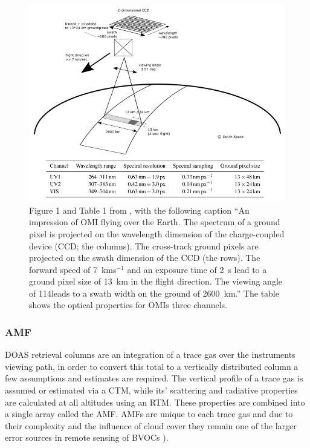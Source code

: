       \begin{figure}
        \includegraphics[width=\textwidth]{Figures/Shenkeveld_OMI_summary.png}
        \caption{ %
          Figure 1 and Table 1 from \cite{Schenkeveld2017}, with the following caption ``An impression of OMI flying over the Earth.
          The spectrum of a ground pixel is projected on the wavelength dimension of the charge-coupled device (CCD; the columns). 
          The cross-track ground pixels are projected on the swath dimension of the CCD (the rows).
          The forward speed of 7~kms$^{-1}$ and an exposure time of 2~s lead to a ground pixel size of 13~km in the flight direction.
          The viewing angle of 114\degr leads to a swath width on the ground of 2600~km.''
          The table shows the optical properties for OMIs three channels.}
      \label{LR:HCHO:Sat:fig_Shenkeveld_OMI_summary}
      \end{figure}
        
    \subsubsection{AMF}
      DOAS retrieval columns are an integration of a trace gas over the instruments viewing path, in order to convert this total to a vertically distributed column a few assumptions and estimates are required. 
      The vertical profile of a trace gas is assumed or estimated via a CTM, while its' scattering and radiative properties are calculated at all altitudes using an RTM. 
      These properties are combined into a single array called the AMF.
      AMFs are unique to each trace gas and due to their complexity and the influence of cloud cover they remain one of the larger error sources in remote sensing of BVOCs \citep{Palmer2001,Millet2006}).
      
